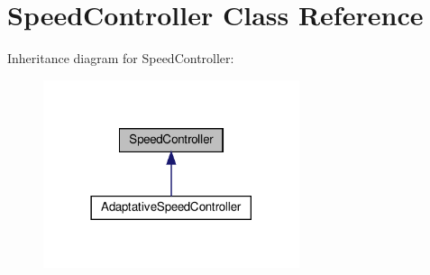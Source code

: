 \hypertarget{classSpeedController}{}\section{Speed\+Controller Class Reference}
\label{classSpeedController}


Inheritance diagram for Speed\+Controller\+:
\nopagebreak
\begin{figure}[H]
\begin{center}
\leavevmode
\includegraphics[width=213pt]{classSpeedController__inherit__graph}
\end{center}
\end{figure}
